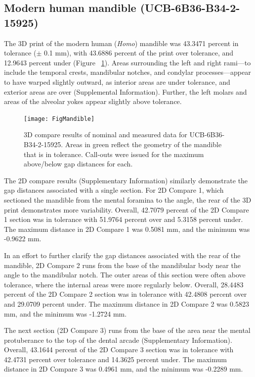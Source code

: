 \documentclass[review]{elsarticle}
\begin{document}
\subsection*{Modern human mandible (UCB-6B36-B34-2-15925)}

The 3D print of the modern human (\textit{Homo}) mandible was 43.3471 percent in tolerance ($\pm$ 0.1 mm), with 43.6886 percent of the print over tolerance, and 12.9643 percent under (Figure ~\ref{fig:FigMandible}). Areas surrounding the left and right rami---to include the temporal crests, mandibular notches, and condylar processes---appear to have warped slightly outward, as interior areas are under tolerance, and exterior areas are over (Supplemental Information). Further, the left molars and areas of the alveolar yokes appear slightly above tolerance.

\begin{figure}[ht]\centering
\texttt{[image: FigMandible]}
\caption{3D compare results of nominal and measured data for UCB-6B36-B34-2-15925. Areas in green reflect the geometry of the mandible that is in tolerance. Call-outs were issued for the maximum above/below gap distances for each.}
\label{fig:FigMandible}
\end{figure}

The 2D compare results (Supplementary Information) similarly demonstrate the gap distances associated with a single section. For 2D Compare 1, which sectioned the mandible from the mental foramina to the angle, the rear of the 3D print demonstrates more variability. Overall, 42.7079 percent of the 2D Compare 1 section was in tolerance with 51.9764 percent over and 5.3158 percent under. The maximum distance in 2D Compare 1 was 0.5081 mm, and the minimum was -0.9622 mm.

In an effort to further clarify the gap distances associated with the rear of the mandible, 2D Compare 2 runs from the base of the mandibular body near the angle to the mandibular notch. The outer areas of this section were often above tolerance, where the internal areas were more regularly below. Overall, 28.4483 percent of the 2D Compare 2 section was in tolerance with 42.4808 percent over and 29.0709 percent under. The maximum distance in 2D Compare 2 was 0.5823 mm, and the minimum was -1.2724 mm.

The next section (2D Compare 3) runs from the base of the area near the mental protuberance to the top of the dental arcade (Supplementary Information). Overall, 43.1644 percent of the 2D Compare 3 section was in tolerance with 42.4731 percent over tolerance and 14.3625 percent under. The maximum distance in 2D Compare 3 was 0.4961 mm, and the minimum was -0.2289 mm.
\end{document}
